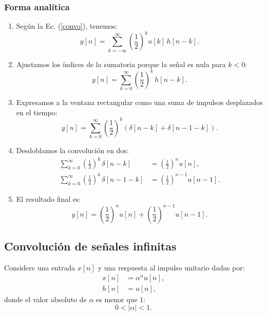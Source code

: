 \subsubsection{Forma analítica}

\begin{enumerate}
	\item Según la Ec. (\ref{convo}), tenemos:
	\begin{equation}
		y[n] = \sum_{k=-\infty}^{\infty} \left( \frac{1}{2}\right)^k u[k] \, h[n-k].
	\end{equation}
	
	\item Ajustamos los índices de la sumatoria porque la señal es nula para $k < 0$:
	\begin{equation}
		y[n] = \sum_{k=0}^{\infty} \left( \frac{1}{2}\right)^k \, h[n-k].
	\end{equation}
	
	\item Expresamos a la ventana rectangular como una suma de impulsos desplazados en el tiempo:
	\begin{equation}
		y[n] = \sum_{k=0}^{\infty} \left( \frac{1}{2}\right)^k \left(\delta[n-k] + \delta[n-1-k] \right).
	\end{equation}
	
	\item Desdoblamos la convolución en dos:
	\begin{align}
		\sum_{k=0}^{\infty} \left( \frac{1}{2}\right)^k \, \delta[n-k] &= \left( \frac{1}{2}\right)^n u[n], \\
		\sum_{k=0}^{\infty} \left( \frac{1}{2}\right)^k \, \delta[n-1-k] &= \left( \frac{1}{2}\right)^{n-1} u[n-1].
	\end{align}
	
	\item El resultado final es:
	\begin{equation}
		y[n] = \left( \frac{1}{2}\right)^n u[n] + \left(\frac{1}{2}\right)^{n-1} u[n-1].
	\end{equation}
\end{enumerate}

\subsection{Convolución de señales infinitas}

Considere una entrada $x[n]$ y una respuesta al impulso unitario dadas por:
\begin{align}
	x[n] &= \alpha^n u[n], \\
	h[n] &= u[n],
\end{align}
donde el valor absoluto de $\alpha$ es menor que $1$:
\begin{equation}
	0 < |\alpha| < 1.
\end{equation}

